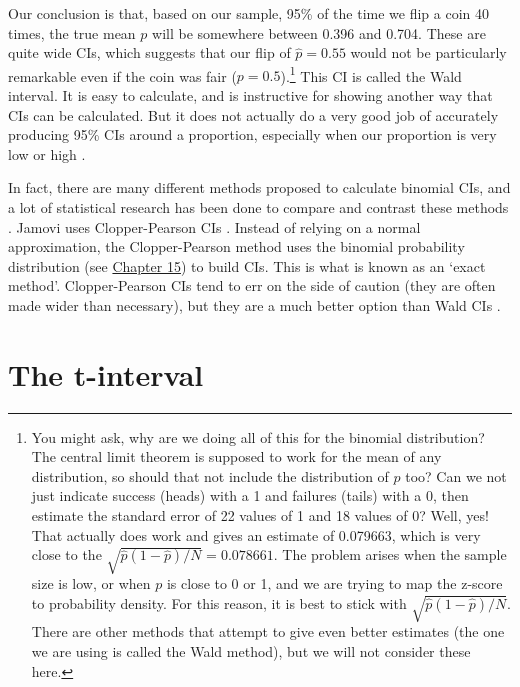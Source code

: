 \documentclass[
  openany]{krantz}
\begin{document}
Our conclusion is that, based on our sample, 95\% of the time we flip a coin 40 times, the true mean \(p\) will be somewhere between 0.396 and 0.704.
These are quite wide CIs, which suggests that our flip of \(\hat{p} = 0.55\) would not be particularly remarkable even if the coin was fair (\(p = 0.5\)).\footnote{You might ask, why are we doing all of this for the binomial distribution? The central limit theorem is supposed to work for the mean of any distribution, so should that not include the distribution of \(p\) too? Can we not just indicate success (heads) with a 1 and failures (tails) with a 0, then estimate the standard error of 22 values of 1 and 18 values of 0? Well, yes! That actually does work and gives an estimate of 0.079663, which is very close to the \(\sqrt{\hat{p}(1-\hat{p})/N} = 0.078661\). The problem arises when the sample size is low, or when \(p\) is close to 0 or 1, and we are trying to map the z-score to probability density. For this reason, it is best to stick with \(\sqrt{\hat{p}(1-\hat{p})/N}\). There are other methods that attempt to give even better estimates (the one we are using is called the Wald method), but we will not consider these here.}
This CI is called the Wald interval.
It is easy to calculate, and is instructive for showing another way that CIs can be calculated.
But it does not actually do a very good job of accurately producing 95\% CIs around a proportion, especially when our proportion is very low or high \citep{Schilling2014, Andersson2023}.

In fact, there are many different methods proposed to calculate binomial CIs, and a lot of statistical research has been done to compare and contrast these methods \citep{Reed2007, Thulin2014, Schilling2014}.
Jamovi uses Clopper-Pearson CIs \citep{Clopper1934}.
Instead of relying on a normal approximation, the Clopper-Pearson method uses the binomial probability distribution (see \protect\hyperlink{Chapter_15}{Chapter 15}) to build CIs.
This is what is known as an `exact method'.
Clopper-Pearson CIs tend to err on the side of caution (they are often made wider than necessary), but they are a much better option than Wald CIs \citep{Reed2007}.

\hypertarget{Chapter_19}{%
\chapter{The t-interval}\label{Chapter_19}}
\end{document}
